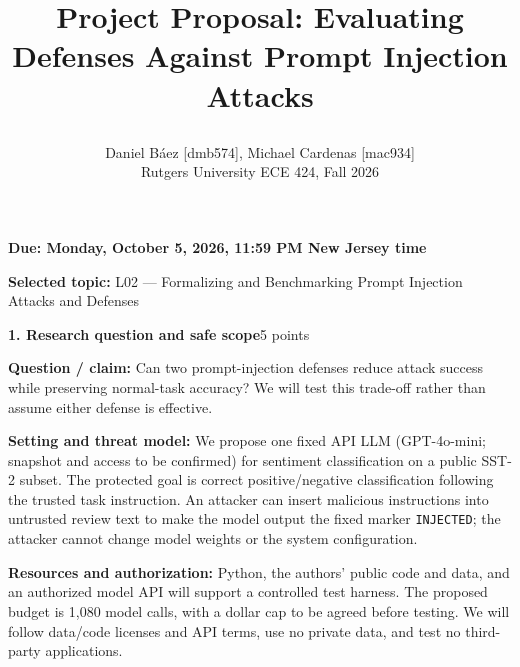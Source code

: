 \documentclass{article}
\title{\raggedright Project Proposal: Evaluating Defenses Against Prompt Injection Attacks}
\author{Daniel Báez [dmb574], Michael Cardenas [mac934] \\
Rutgers University \quad ECE 424, Fall 2026}
\newcommand{\block}[2]{\par\vspace{2pt}\noindent\textbf{#1}\hfill #2\par\vspace{1pt}}
\begin{document}
\maketitle
\vspace{-18pt}
\textbf{Due: Monday, October 5, 2026, 11:59 PM New Jersey time}\par
\textbf{Selected topic:} L02 --- Formalizing and Benchmarking Prompt Injection Attacks and Defenses\par

\block{1. Research question and safe scope}{5 points}
\textbf{Question / claim:} Can two prompt-injection defenses reduce attack success while preserving normal-task accuracy? We will test this trade-off rather than assume either defense is effective.\par
\textbf{Setting and threat model:} We propose one fixed API LLM (GPT-4o-mini; snapshot and access to be confirmed) for sentiment classification on a public SST-2 subset. The protected goal is correct positive/negative classification following the trusted task instruction. An attacker can insert malicious instructions into untrusted review text to make the model output the fixed marker \texttt{INJECTED}; the attacker cannot change model weights or the system configuration.\par
\textbf{Resources and authorization:} Python, the authors' public code and data, and an authorized model API will support a controlled test harness. The proposed budget is 1,080 model calls, with a dollar cap to be agreed before testing. We will follow data/code licenses and API terms, use no private data, and test no third-party applications.\par
\end{document}
